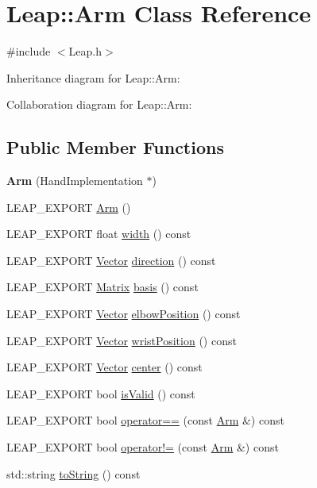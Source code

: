 \hypertarget{class_leap_1_1_arm}{}\section{Leap\+:\+:Arm Class Reference}
\label{class_leap_1_1_arm}


{\ttfamily \#include $<$Leap.\+h$>$}



Inheritance diagram for Leap\+:\+:Arm\+:


Collaboration diagram for Leap\+:\+:Arm\+:
\subsection*{Public Member Functions}
\begin{DoxyCompactItemize}
\item 
\mbox{\label{class_leap_1_1_arm_aa33c922077d409f205dd3212d91f3981}} 
{\bfseries Arm} (Hand\+Implementation $\ast$)
\item 
L\+E\+A\+P\+\_\+\+E\+X\+P\+O\+RT \hyperlink{class_leap_1_1_arm_a06812410f5051730fcd3f1e050e76a22}{Arm} ()
\item 
L\+E\+A\+P\+\_\+\+E\+X\+P\+O\+RT float \hyperlink{class_leap_1_1_arm_a7a45202de177e3f6f8c1b5847465993a}{width} () const
\item 
L\+E\+A\+P\+\_\+\+E\+X\+P\+O\+RT \hyperlink{struct_leap_1_1_vector}{Vector} \hyperlink{class_leap_1_1_arm_a5c09d28debc4e43d557cff04f62b621d}{direction} () const
\item 
L\+E\+A\+P\+\_\+\+E\+X\+P\+O\+RT \hyperlink{struct_leap_1_1_matrix}{Matrix} \hyperlink{class_leap_1_1_arm_aa08418804add6ed37c5520015123c716}{basis} () const
\item 
L\+E\+A\+P\+\_\+\+E\+X\+P\+O\+RT \hyperlink{struct_leap_1_1_vector}{Vector} \hyperlink{class_leap_1_1_arm_a880ac49c9c85e9d45cd71497e0d08749}{elbow\+Position} () const
\item 
L\+E\+A\+P\+\_\+\+E\+X\+P\+O\+RT \hyperlink{struct_leap_1_1_vector}{Vector} \hyperlink{class_leap_1_1_arm_a3543639cac98fa4488bd0df2216bba9f}{wrist\+Position} () const
\item 
L\+E\+A\+P\+\_\+\+E\+X\+P\+O\+RT \hyperlink{struct_leap_1_1_vector}{Vector} \hyperlink{class_leap_1_1_arm_a3159add2e3c4d5c3bbb5118a0e01af11}{center} () const
\item 
L\+E\+A\+P\+\_\+\+E\+X\+P\+O\+RT bool \hyperlink{class_leap_1_1_arm_a1bcc12c7064493aced6f2f53eb617c24}{is\+Valid} () const
\item 
L\+E\+A\+P\+\_\+\+E\+X\+P\+O\+RT bool \hyperlink{class_leap_1_1_arm_aa70ba8d8ff413608e9dee638c1f04f46}{operator==} (const \hyperlink{class_leap_1_1_arm}{Arm} \&) const
\item 
L\+E\+A\+P\+\_\+\+E\+X\+P\+O\+RT bool \hyperlink{class_leap_1_1_arm_a99089dc7d5792f516a6529aa25436c84}{operator!=} (const \hyperlink{class_leap_1_1_arm}{Arm} \&) const
\item 
std\+::string \hyperlink{class_leap_1_1_arm_ac8cab698eef881e338b63d713baaccbb}{to\+String} () const
\end{DoxyCompactItemize}
